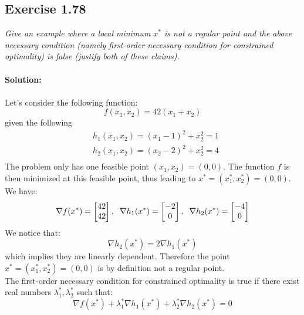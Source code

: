 \subsection{Exercise 1.78}
\emph{Give an example where a local minimum $x^*$ is not a regular point and the above necessary condition (namely first-order necessary condition for constrained optimality) is false (justify both of these claims).}\\
\\
\textbf{Solution:}\\
\\
Let's consider the following function:
\begin{equation}
    f(x_1, x_2) = 42(x_1 + x_2)
\end{equation}
given the following
\begin{align}
    &h_1(x_1, x_2) = (x_1 - 1) ^2 + x_2^2 = 1\\
    &h_2(x_1, x_2) = (x_2 - 2) ^2 + x_2^2 = 4\\
\end{align}
The problem only has one feasible point $(x_1, x_2) = (0, 0)$. The function $f$ is then minimized at this feasible point, thus leading to $x^* = (x_1^*, x_2^*) = (0, 0) $. We have:
\begin{equation}
    \nabla f(x^*) = \begin{bmatrix} 42 \\ 42 \end{bmatrix}, \hspace{0.2cm} \nabla h_1(x^*) = \begin{bmatrix} -2 \\ 0 \end{bmatrix}, \hspace{0.2cm} \nabla h_2(x^*) = \begin{bmatrix} -4 \\ 0 \end{bmatrix}
\end{equation}
We notice that:
\begin{equation}
    \nabla h_2(x^*) = 2 \nabla h_1(x^*) 
\end{equation}
which implies they are linearly dependent. Therefore the point $x^* = (x_1^*, x_2^*) = (0, 0) $ is by definition not a regular point.\\
The first-order necessary condition for constrained optimality is true if there exist real numbers $\lambda_1^*, \lambda_2^*$ such that:
\begin{equation}
    \nabla f(x^*) + \lambda_1^* \nabla h_1 (x^*) + \lambda_2^* \nabla h_2 (x^*) = 0
\end{equation}
